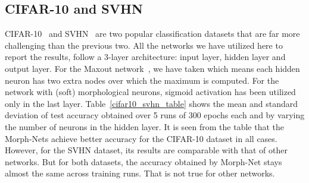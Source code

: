 \documentclass{bmvc2k}
\begin{document}
\subsection{CIFAR-10 and SVHN}
CIFAR-10~\cite{krizhevsky_learning_2009} and SVHN~\cite{netzer2011reading} are two popular classification datasets that are far more challenging than the previous two. All the networks we have utilized here to report the results, follow a 3-layer architecture: input layer, hidden layer and output layer. For the Maxout network~\cite{goodfellow_maxout_2013}, we have taken  which means each hidden neuron has two extra nodes over which the maximum is computed. For the network with (soft) morphological neurons, sigmoid activation has been utilized only in the last layer. Table~\ref{cifar10_svhn_table} shows the mean and standard deviation of test accuracy obtained over 5 runs of 300 epochs each and by varying the number of neurons in the hidden layer. It is seen from the table that the Morph-Nets achieve better accuracy for the CIFAR-10 dataset in all cases. However, for the SVHN dataset, its results are comparable with that of other networks. But for both datasets, the accuracy obtained by Morph-Net stays almost the same across training runs. That is not true for other networks.
\end{document}
